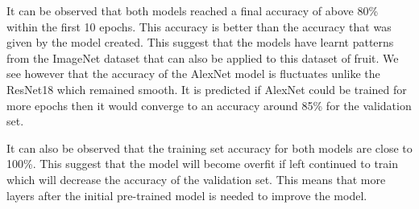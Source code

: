 \documentclass[../main.tex]{subfiles}
\begin{document}
It can be observed that both models reached a final accuracy of above 80\% within the first 10 epochs. This accuracy is better than the accuracy that was given by the model created. This suggest that the models have learnt patterns from the ImageNet dataset that can also be applied to this dataset of fruit. We see however that the accuracy of the AlexNet model is fluctuates unlike the ResNet18 which remained smooth. It is predicted if AlexNet could be trained for more epochs then it would converge to an accuracy around 85\% for the validation set. 

It can also be observed that the training set accuracy for both models are close to 100\%. This suggest that the model will become overfit if left continued to train which will decrease the accuracy of the validation set. This means that more layers after the initial pre-trained model is needed to improve the model. 
\end{document}
